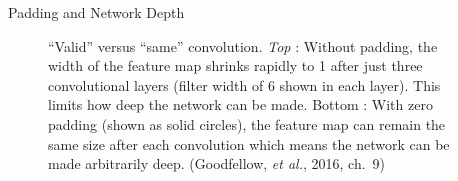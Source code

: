 
\begin{frame}{Padding and Network Depth}
\begin{figure}
\center
{}
\caption{\small{\enquote{Valid} versus \enquote{same} convolution. \emph{Top} : Without padding, the width of the feature map shrinks rapidly to 1 after just three convolutional layers (filter width of 6 shown in each layer). This limits how deep the network can be made. {Bottom} : With zero padding (shown as solid circles), the feature map can remain the same size after each convolution which means the network can be made arbitrarily deep. (Goodfellow, \emph{et al.}, 2016, ch.~9)}}
\end{figure}
\end{frame}

\endlecture
